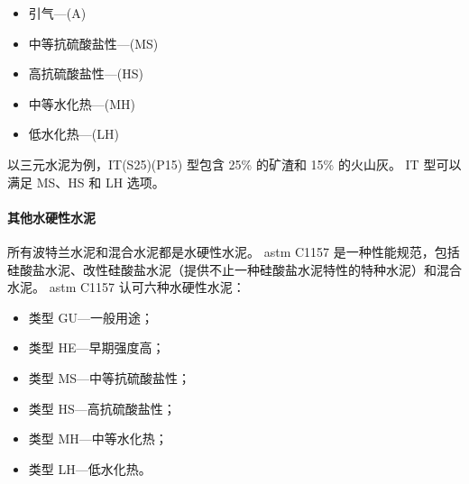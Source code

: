 \begin{itemize}
  \item 引气—(A)
  \item 中等抗硫酸盐性—(MS)
  \item 高抗硫酸盐性—(HS)
  \item 中等水化热—(MH)
  \item 低水化热—(LH)
\end{itemize}

以三元水泥为例，IT(S25)(P15) 型包含 25\% 的矿渣和 15\% 的火山灰。 IT 型可以满足 MS、HS 和 LH 选项。

\paragraph{其他水硬性水泥}
所有波特兰水泥和混合水泥都是水硬性水泥。 \acrshort*{astm} C1157 是一种性能规范，包括硅酸盐水泥、改性硅酸盐水泥（提供不止一种硅酸盐水泥特性的特种水泥）和混合水泥。 \acrshort*{astm} C1157 认可六种水硬性水泥：
\begin{itemize}
  \item 类型 GU—一般用途；
  \item 类型 HE—早期强度高；
  \item 类型 MS—中等抗硫酸盐性；
  \item 类型 HS—高抗硫酸盐性；
  \item 类型 MH—中等水化热；
  \item 类型 LH—低水化热。
\end{itemize}

